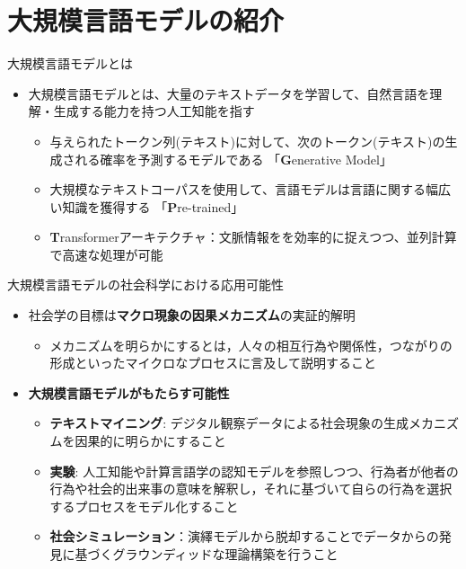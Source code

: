 \documentclass{beamer}
\newcommand{\boldcolor}[1]{\textbf{\textcolor{custompurple}{#1}}}
\begin{document}
    \section{大規模言語モデルの紹介}

    \begin{frame}{大規模言語モデルとは}{\secname}
    \begin{itemize}
        \item 大規模言語モデルとは、大量のテキストデータを学習して、自然言語を理解・生成する能力を持つ人工知能を指す
        \pause
        \begin{itemize}
            \item 与えられたトークン列(テキスト)に対して、次のトークン(テキスト)の生成される確率を予測するモデルである 「\boldcolor{G}enerative Model」
            \pause
            \item 大規模なテキストコーパスを使用して、言語モデルは言語に関する幅広い知識を獲得する 「\boldcolor{P}re-trained」
            \pause
            \item \boldcolor{T}ransformerアーキテクチャ：文脈情報をを効率的に捉えつつ、並列計算で高速な処理が可能
        \end{itemize}
    \end{itemize}
    \end{frame}

    \begin{frame}{大規模言語モデルの社会科学における応用可能性}{\secname}
    \begin{itemize}
        \item 社会学の目標は\textbf{マクロ現象の因果メカニズム}の実証的解明
        \begin{itemize}
            \item メカニズムを明らかにするとは，人々の相互行為や関係性，つながりの形成といったマイクロなプロセスに言及して説明すること
        \end{itemize}
        \pause
        \item \textbf{大規模言語モデルがもたらす可能性}
        \begin{itemize}
            \item \boldcolor{テキストマイニング}: デジタル観察データによる社会現象の生成メカニズムを因果的に明らかにすること
            \pause
            \item \boldcolor{実験}: 人工知能や計算言語学の認知モデルを参照しつつ、行為者が他者の行為や社会的出来事の意味を解釈し，それに基づいて自らの行為を選択するプロセスをモデル化すること
            \pause
            \item \boldcolor{社会シミュレーション}：演繹モデルから脱却することでデータからの発見に基づくグラウンディッドな理論構築を行うこと
        \end{itemize}
    \end{itemize}
    \end{frame}
\end{document}
